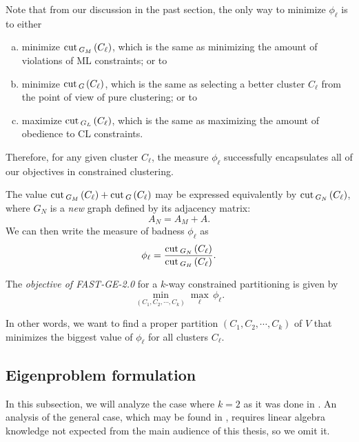 Note that from our discussion in the past section, the only way to minimize $\phi_\ell$ is to either
\begin{enumerate}[(a)]
   \item minimize $\operatorname{cut\,}_{G_M\,}(C_\ell)$, which is the same as minimizing the amount of violations of ML constraints; or to
   \item minimize $\operatorname{cut\,}_{G\,}(C_\ell)$, which is the same as selecting a better cluster $C_\ell$ from the point of view of pure clustering; or to
   \item maximize $\operatorname{cut\,}_{G_L\,}(C_\ell)$, which is the same as maximizing the amount of obedience to CL constraints.
\end{enumerate}
Therefore, for any given cluster $C_\ell$, the measure $\phi_\ell$ successfully encapsulates all of our objectives in constrained clustering.

\begin{remark}
   The value $\operatorname{cut\,}_{G_M\,}(C_\ell) + \operatorname{cut\,}_{G\,}(C_\ell)$ may be expressed equivalently by $\operatorname{cut\,}_{G_N\,}(C_\ell)$, where $G_N$ is a \textit{new} graph defined by its adjacency matrix:
   \begin{equation}
      A_N = A_M+A.
   \end{equation}
   We can then write the measure of badness $\phi_\ell$ as
   \begin{equation}
      \phi_\ell = \frac{\operatorname{cut\,}_{G_N\,}(C_\ell)}{\operatorname{cut\,}_{G_H\,}(C_\ell)}.
   \end{equation}
\end{remark}


\begin{definition}
   The \textit{objective of FAST-GE-2.0} for a $k$-way constrained partitioning is given by
   \begin{equation}\label{objective}
      \min_{(C_1, C_2, \cdots, C_k)} \max_{\ell} \, \phi _\ell.
   \end{equation}
\end{definition}

In other words, we want to find a proper partition $(C_1, C_2, \cdots, C_k)$ of $V$ that minimizes the biggest value of $\phi_\ell$ for all clusters $C_\ell$.

\subsection{Eigenproblem formulation}
In this subsection, we will analyze the case where $k = 2$ as it was done in \cite{fastge2}.
An analysis of the general case, which may be found in \cite{fastge1}, requires linear algebra knowledge not expected from the main audience of this thesis, so we omit it.

